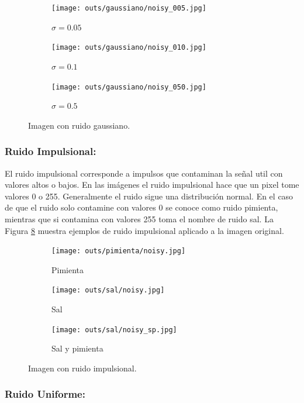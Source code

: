 \documentclass[
  letterpaper,
  twocolumn,
  9pt,
  journal,
  final]{IEEEtran}
\begin{document}
\begin{figure}[!tbh]
  \centering
  \begin{subfigure}[b]{.32\linewidth}
    \texttt{[image: outs/gaussiano/noisy\_005.jpg]}
    \caption{$\sigma=0.05$}\label{gauss_1}
  \end{subfigure}
  \begin{subfigure}[b]{.32\linewidth}
    \texttt{[image: outs/gaussiano/noisy\_010.jpg]}
    \caption{$\sigma=0.1$}\label{gauss_2}
  \end{subfigure}
  \begin{subfigure}[b]{.32\linewidth}
    \texttt{[image: outs/gaussiano/noisy\_050.jpg]}
    \caption{$\sigma=0.5$}\label{gauss_3}
  \end{subfigure}
  \caption{Imagen con ruido gaussiano.}
  \label{gauss}
\end{figure}

\subsubsection{Ruido Impulsional:}
El ruido impulsional corresponde a impulsos que contaminan la señal util con valores altos o bajos. En las imágenes el ruido impulsional hace que un pixel tome valores 0 o 255. Generalmente el ruido sigue una distribución normal. En el caso de que el ruido solo contamine con valores 0 se conoce como ruido pimienta, mientras que si contamina con valores 255 toma el nombre de ruido sal. La Figura \ref{impulsional} muestra ejemplos de ruido impulsional aplicado a la imagen original.

\begin{figure}[!tbh]
  \centering
  \begin{subfigure}[b]{.32\linewidth}
    \texttt{[image: outs/pimienta/noisy.jpg]}
    \caption{Pimienta}\label{pimienta}
  \end{subfigure}
  \begin{subfigure}[b]{.32\linewidth}
    \texttt{[image: outs/sal/noisy.jpg]}
    \caption{Sal}\label{sal}
  \end{subfigure}
  \begin{subfigure}[b]{.32\linewidth}
    \texttt{[image: outs/sal/noisy\_sp.jpg]}
    \caption{Sal y pimienta}\label{sal_pimienta}
  \end{subfigure}
  \caption{Imagen con ruido impulsional.}
  \label{impulsional}
\end{figure}

\subsubsection{Ruido Uniforme:}
\end{document}
